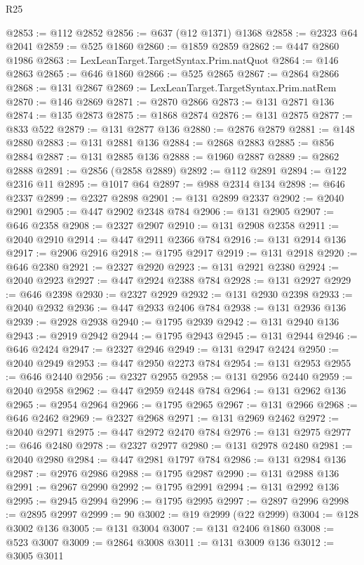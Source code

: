 \begin{lexlean}{R25}
\begin{coremodule}
@2853 := @112 @2852
@2856 := @637 (@12 @1371) @1368
@2858 := @2323 @64 @2041
@2859 := @525 @1860
@2860 := @1859 @2859
@2862 := @447 @2860 @1986
@2863 := LexLeanTarget.TargetSyntax.Prim.natQuot
@2864 := @146 @2863
@2865 := @646 @1860
@2866 := @525 @2865
@2867 := @2864 @2866
@2868 := @131 @2867
@2869 := LexLeanTarget.TargetSyntax.Prim.natRem
@2870 := @146 @2869
@2871 := @2870 @2866
@2873 := @131 @2871 @136
@2874 := @135 @2873
@2875 := @1868 @2874
@2876 := @131 @2875
@2877 := @833 @522
@2879 := @131 @2877 @136
@2880 := @2876 @2879
@2881 := @148 @2880
@2883 := @131 @2881 @136
@2884 := @2868 @2883
@2885 := @856 @2884
@2887 := @131 @2885 @136
@2888 := @1960 @2887
@2889 := @2862 @2888
@2891 := @2856 (@2858 @2889)
@2892 := @112 @2891
@2894 := @122 @2316 @11
@2895 := @1017 @64
@2897 := @988 @2314 @134
@2898 := @646 @2337
@2899 := @2327 @2898
@2901 := @131 @2899 @2337
@2902 := @2040 @2901
@2905 := @447 @2902 @2348 @784
@2906 := @131 @2905
@2907 := @646 @2358
@2908 := @2327 @2907
@2910 := @131 @2908 @2358
@2911 := @2040 @2910
@2914 := @447 @2911 @2366 @784
@2916 := @131 @2914 @136
@2917 := @2906 @2916
@2918 := @1795 @2917
@2919 := @131 @2918
@2920 := @646 @2380
@2921 := @2327 @2920
@2923 := @131 @2921 @2380
@2924 := @2040 @2923
@2927 := @447 @2924 @2388 @784
@2928 := @131 @2927
@2929 := @646 @2398
@2930 := @2327 @2929
@2932 := @131 @2930 @2398
@2933 := @2040 @2932
@2936 := @447 @2933 @2406 @784
@2938 := @131 @2936 @136
@2939 := @2928 @2938
@2940 := @1795 @2939
@2942 := @131 @2940 @136
@2943 := @2919 @2942
@2944 := @1795 @2943
@2945 := @131 @2944
@2946 := @646 @2424
@2947 := @2327 @2946
@2949 := @131 @2947 @2424
@2950 := @2040 @2949
@2953 := @447 @2950 @2273 @784
@2954 := @131 @2953
@2955 := @646 @2440
@2956 := @2327 @2955
@2958 := @131 @2956 @2440
@2959 := @2040 @2958
@2962 := @447 @2959 @2448 @784
@2964 := @131 @2962 @136
@2965 := @2954 @2964
@2966 := @1795 @2965
@2967 := @131 @2966
@2968 := @646 @2462
@2969 := @2327 @2968
@2971 := @131 @2969 @2462
@2972 := @2040 @2971
@2975 := @447 @2972 @2470 @784
@2976 := @131 @2975
@2977 := @646 @2480
@2978 := @2327 @2977
@2980 := @131 @2978 @2480
@2981 := @2040 @2980
@2984 := @447 @2981 @1797 @784
@2986 := @131 @2984 @136
@2987 := @2976 @2986
@2988 := @1795 @2987
@2990 := @131 @2988 @136
@2991 := @2967 @2990
@2992 := @1795 @2991
@2994 := @131 @2992 @136
@2995 := @2945 @2994
@2996 := @1795 @2995
@2997 := @2897 @2996
@2998 := @2895 @2997
@2999 := 90
@3002 := @19 @2999 (@22 @2999)
@3004 := @128 @3002 @136
@3005 := @131 @3004
@3007 := @131 @2406 @1860
@3008 := @523 @3007
@3009 := @2864 @3008
@3011 := @131 @3009 @136
@3012 := @3005 @3011

\end{coremodule}
\end{lexlean}
